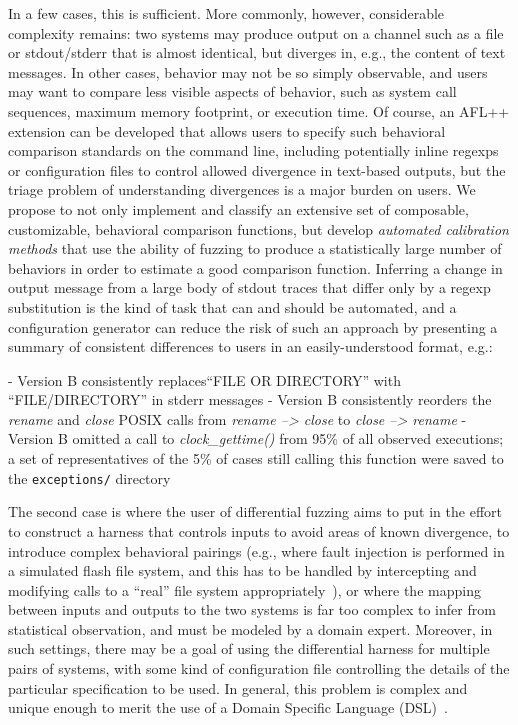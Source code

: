 In a few
cases, this is sufficient.  More commonly, however, considerable complexity
remains:  two systems may produce output on a channel such as a file
or stdout/stderr that is almost identical, but diverges in, e.g., the
content of text messages.  In other cases, behavior may not be so
simply observable, and users may want to compare less visible aspects
of behavior, such as system call sequences, maximum memory footprint,
or execution time.  Of course, an AFL++ extension can be developed
that allows users to specify such behavioral comparison standards on
the command line, including potentially inline regexps or
configuration files to control allowed divergence in text-based
outputs, but the triage problem of understanding divergences is a
major burden on users.  We propose to not only implement and classify
an extensive set of composable, customizable, behavioral comparison
functions, but develop \emph{automated calibration methods} that use the
ability of fuzzing to produce a statistically large number of
behaviors in order to estimate a good comparison function.  Inferring a change
in output message from a large body of stdout traces that differ only
by a regexp substitution is the kind of task that can and should be
automated, and a configuration generator can reduce the risk of such
an approach by presenting a summary of consistent differences to
users in an easily-understood format, e.g.:

\begin{code}
- Version B consistently replaces``FILE OR DIRECTORY'' with 
``FILE/DIRECTORY'' in stderr messages
- Version B consistently reorders the \emph{rename} and \emph{close}
POSIX calls from \emph{rename --> close} to \emph{close --> rename}
- Version B omitted a call to \emph{clock\_gettime()} from 95\% of
all observed executions; a set of representatives of the 5\% of cases
still calling this function were saved to the {\tt exceptions/} directory
\end{code}

The second case is where the user of differential fuzzing aims to
put in the effort to construct a harness that controls inputs to avoid
areas of known divergence, to introduce complex behavioral pairings
(e.g., where fault injection is performed in a simulated flash file
system, and this has to be handled by intercepting and modifying calls
to a ``real'' file system appropriately~\cite{ICSEDiff}), or where the
mapping between inputs and outputs to the two systems is far too
complex to infer from statistical observation, and must be modeled by
a domain expert.  Moreover, in such settings, there may be a goal of
using the differential harness for multiple pairs of systems, with
some kind of configuration file controlling the details of the
particular specification to be used.  In general, this problem is
complex and unique enough to merit the use of a Domain Specific
Language (DSL)~\cite{mernik2005domain,fowler2010domain}.

